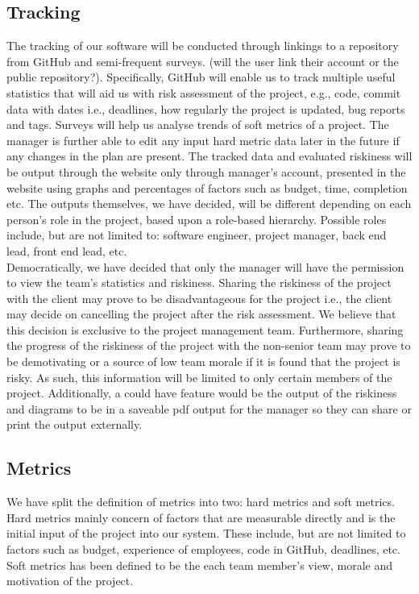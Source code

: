 \documentclass[a4paper]{article}
\theoremstyle{plain}
\theoremstyle{definition}
\theoremstyle{remark}
\begin{document}
\subsection{Tracking}
The tracking of our software will be conducted through linkings to a repository from GitHub and semi-frequent surveys. (will the user link their account or the public repository?). Specifically, GitHub will enable us to track multiple useful statistics that will aid us with risk assessment of the project, e.g., code, commit data with dates i.e., deadlines, how regularly the project is updated, bug reports and tags. Surveys will help us analyse trends of soft metrics of a project. The manager is further able to edit any input hard metric data later in the future if any changes in the plan are present. The tracked data and evaluated riskiness will be output through the website only through manager's account, presented in the website using graphs and percentages of factors such as budget, time, completion etc. The outputs themselves, we have decided, will be different depending on each person's role in the project, based upon a role-based hierarchy. Possible roles include, but are not limited to: software engineer, project manager, back end lead, front end lead, etc. \\

\noindent Democratically, we have decided that only the manager will have the permission to view the team's statistics and riskiness. Sharing the riskiness of the project with the client may prove to be disadvantageous for the project i.e., the client may decide on cancelling the project after the risk assessment. We believe that this decision is exclusive to the project management team. Furthermore, sharing the progress of the riskiness of the project with the non-senior team may prove to be demotivating or a source of low team morale if it is found that the project is risky. As such, this information will be limited to only certain members of the project. Additionally, a could have feature would be the output of the riskiness and diagrams to be in a saveable pdf output for the manager so they can share or print the output externally.
\subsection{Metrics}
We have split the definition of metrics into two: hard metrics and soft metrics. Hard metrics mainly concern of factors that are measurable directly and is the initial input of the project into our system. These include, but are not limited to factors such as budget, experience of employees, code in GitHub, deadlines, etc. Soft metrics has been defined to be the each team member's view, morale and motivation of the project. \\
\end{document}
